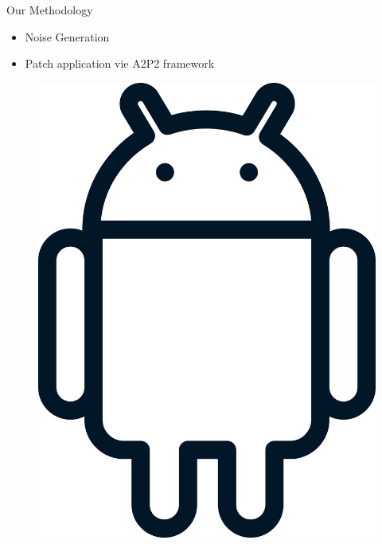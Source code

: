 \documentclass[aspectratio=169]{beamer}
[aspectratio=169] %
\begin{document}
\begin{frame}{Our Methodology}
  \begin{minipage}{0.49\textwidth} 
    \begin{itemize}
      \item Noise Generation
      \item Patch application vie A2P2 framework
    \end{itemize}
  \end{minipage}
  \hfill
  \begin{minipage}{0.49\textwidth} 
    \begin{figure}
      \centering
      \includegraphics[height=0.5\textheight]{figures/android.png}
    \end{figure}
  \end{minipage}
\end{frame}
\end{document}
